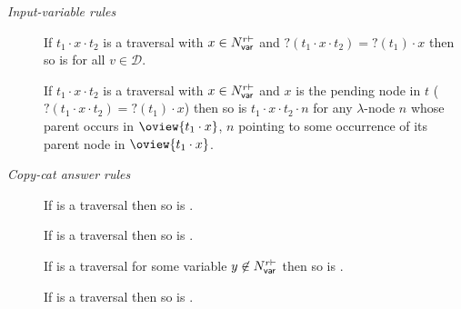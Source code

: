 \begin{definition}
\noindent \emph{Input-variable rules}
\begin{description}
\item[] If $t_1 \cdot x \cdot t_2$ is a traversal
with $x \in N_{\sf var}^{r\vdash}$ and $?(t_1 \cdot x
\cdot t_2)=?(t_1) \cdot x$ then so is  for all $v \in
\mathcal{D}$.

\item[] If $t_1 \cdot x \cdot t_2$ is a traversal with
  $x \in N_{\sf var}^{r\vdash}$ and $x$ is the pending node in $t$ ($?(t_1 \cdot x \cdot
  t_2)=?(t_1) \cdot x$) then so is $t_1 \cdot x \cdot t_2 \cdot
  n$ for any $\lambda$-node $n$ whose parent occurs in
  $\oview{t_1 \cdot x}$, $n$ pointing to some occurrence of its
  parent node in $\oview{t_1 \cdot x}$.
\end{description}

\noindent \emph{Copy-cat answer rules}
\begin{description}
\item[]
  If 
is a traversal then so is .

\item[] If 
is a traversal then so is .

\item[] If  is a
traversal for some variable $y\not\in N_{\sf var}^{r\vdash}$ then so is .

\item[] If 
is a traversal then so is .
\end{description}


\end{definition}
